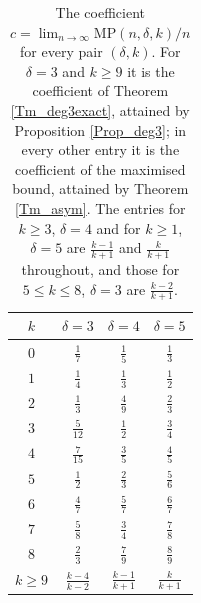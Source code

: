 \documentclass[10pt,a4paper]{article}
\begin{document}
\begin{table}[htbp]
\begin{center}
\begin{tabular}{|c|c|c|c|}
\hline
$k$ & $\delta =3$ & $\delta =4$ & $\delta =5$\\ \hline
$0$ & $\frac{1}{7}$ & $\frac{1}{5}$ & $\frac{1}{3}$\\[1mm]
$1$ & $\frac{1}{4}$ & $\frac{1}{3}$ & $\frac{1}{2}$\\[1mm]
$2$ & $\frac{1}{3}$ & $\frac{4}{9}$ & $\frac{2}{3}$\\[1mm]
$3$ & $\frac{5}{12}$ & $\frac{1}{2}$ & $\frac{3}{4}$\\[1mm]
$4$ & $\frac{7}{15}$ & $\frac{3}{5}$ & $\frac{4}{5}$\\[1mm]
$5$ & $\frac{1}{2}$ & $\frac{2}{3}$ & $\frac{5}{6}$\\[1mm]
$6$ & $\frac{4}{7}$ & $\frac{5}{7}$ & $\frac{6}{7}$\\[1mm]
$7$ & $\frac{5}{8}$ & $\frac{3}{4}$ & $\frac{7}{8}$\\[1mm]
$8$ & $\frac{2}{3}$ & $\frac{7}{9}$ & $\frac{8}{9}$\\[1mm]
$k\geq 9$ & $\frac{k-4}{k-2}$ & $\frac{k-1}{k+1}$ & $\frac{k}{k+1}$\\ \hline
\end{tabular}
\end{center}
\caption{The coefficient $c=\lim_{n\to \infty }\mathrm{MP}(n,\delta ,k)/n$ for every pair
$(\delta ,k)$. For $\delta =3$ and $k\geq 9$ it is the coefficient of Theorem \ref{Tm_deg3exact},
attained by Proposition \ref{Prop_deg3}; in every other entry it is the coefficient of the maximised
bound, attained by Theorem \ref{Tm_asym}. The entries for $k\geq 3$, $\delta =4$ and for $k\geq 1$,
$\delta =5$ are $\frac{k-1}{k+1}$ and $\frac{k}{k+1}$ throughout, and those for $5\leq k\leq 8$,
$\delta =3$ are $\frac{k-2}{k+1}$.}%
\label{Tab_coeff}%
\end{table}
\end{document}
